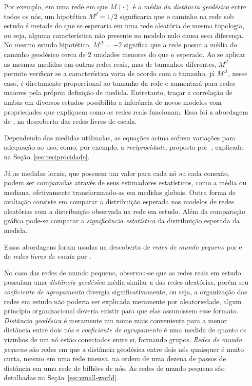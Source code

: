 \documentclass[12pt,a4paper,final]{article}
\begin{document}
Por exemplo, em uma rede em que $M(\cdot)$ é a \textit{média da distância geodésica} entre todos os nós, um hipotético $M^d = 1/2$ significaria que o caminho na rede sob estudo é metade do que se esperaria em uma rede aleatória de mesma topologia, ou seja, alguma característica não presente no modelo nulo causa essa diferença. No mesmo estudo hipotético, $M^\Delta = -2$ significa que a rede possui a média do caminho geodésico cerca de 2 unidades menores do que o esperado. Ao se aplicar as mesmas medidas em outras redes reais, mas de tamanhos diferentes, $M^d$ permite verificar se a característica varia de acordo com o tamanho, já $M^\Delta$, nesse caso, é diretamente proporcional ao tamanho da rede e aumentará para redes maiores pela própria definição de medida. Entretanto, traçar a correlação de ambas em diversos estudos possibilita a inferência de novos modelos com propriedades que expliquem como as redes reais funcionam. Essa foi a abordagem de \cite{Barabasi1999-sn}, na descoberta das redes livres de escala. 

Dependendo das medidas utilizadas, as equações acima sofrem variações para adequação ao uso, como, por exemplo, a \textit{reciprocidade}, proposta por~, explicada na Seção~\ref{sec:reciprocidade}.

Já as medidas locais, que possuem um valor para cada nó ou cada conexão, podem ser comparadas através de seus estimadores estatísticos, como a média ou mediana, efetivamente transformando-as em medidas globais. Outra forma de avaliação consiste em comparar a distribuição esperada nos modelos de redes aleatórias com a distribuição observada na rede em estudo. Além da comparação gráfica pode-se comparar a \textit{significância estatística} da distribuição esperada da medida.


Essas abordagens foram usadas na descoberta de \textit{redes de mundo pequeno} por  e de \textit{redes livres de escala} por .

No caso das redes de mundo pequeno, observou-se que as redes reais em estudo possuíam uma \textit{distância geodésica} média similar a das redes aleatórias, porém seu \textit{coeficiente de agrupamento} divergia significativamente, ou seja, a organização das redes em estudo não poderia ser explicada meramente por aleatoriedade, algum princípio organizacional deveria existir para que elas assumissem esse formato. \textit{Distância geodésica} é meramente um nome mais conveniente para a menor distância entre dois nós e \textit{coeficiente de agrupamento} é uma medida de quanto os vizinhos de um nó estão conectados entre si, formando grupos. \textit{Redes de mundo pequeno} são redes em que a distância geodésica entre dois nós quaisquer é muito curta, mesmo em uma rede imensa, na ordem de uma dezena de passos de distância em uma rede de bilhões de nós. As redes de mundo pequeno são detalhadas na Seção~\ref{sec:small-world}. 
\end{document}
